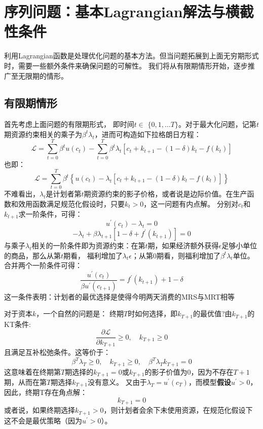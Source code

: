 \section{序列问题：基本Lagrangian解法与横截性条件} \label{sec-sp}

利用Lagrangian函数是处理优化问题的基本方法。但当问题拓展到上面无穷期形式时，需要一些额外条件来确保问题的可解性。
我们将从有限期情形开始，逐步推广至无限期的情形。


\subsection{有限期情形} \label{subsec-finite-h}

首先考虑上面问题的有限期形式，
即时间$t \in$ $\{0,1, \ldots T\}$。对于最大化问题，记第$t$期资源约束相关的乘子为$\beta^t \lambda_t$，进而可构造如下拉格朗日方程：
$$
\mathcal{L}=\sum_{t=0}^T \beta^t u\left(c_t\right)-\sum_{t=0}^T \beta^t \lambda_t\left[c_t+k_{t+1}-(1-\delta) k_t-f\left(k_t\right)\right]
$$
也即：
$$
\mathcal{L}=\sum_{t=0}^T \beta^t\left\{u\left(c_t\right)-\lambda_t\left[c_t+k_{t+1}-(1-\delta) k_t-f\left(k_t\right)\right]\right\}
$$
不难看出，$\lambda_t$是计划者第$t$期资源约束的影子价格，或者说是边际价值。在生产函数和效用函数满足规范化假设时，只要$k_t>0$，这一问题有内点解。
分别对$c_t$和$k_{t+1}$求一阶条件，可得：
$$u^{\prime}\left(c_t\right)-\lambda_t=0$$
$$-\lambda_t+\beta\lambda_{t+1}\left[1-\delta+f^{\prime}\left(k_{t+1}\right)\right]=0$$
与乘子$\lambda_t$相关的一阶条件即为资源约束：在第$t$期，如果经济额外获得$\epsilon$足够小单位的商品，那么从第$t$期看，
福利增加了$\lambda_t\epsilon$；从第0期看，则福利增加了$\beta^t\lambda_t$单位。
合并两个一阶条件可得：
$$
\frac{u^{\prime}\left(c_t\right)}{\beta u^{\prime}\left(c_{t+1}\right)}=f^{\prime}\left(k_{t+1}\right)+1-\delta
$$
这一条件表明：计划者的最优选择是使得今明两天消费的MRS与MRT相等

对于资本$k$，一个自然的问题是：
终期$T$时如何选择，即$k_{T+1}$的最优值?由$k_{T+1}$的KT条件:
$$\frac{\partial \mathcal{L}}{\partial k_{T+1}} \geq 0, \quad k_{T+1} \geq 0$$
且满足互补松弛条件。这等价于：
$$
\beta^T \lambda_T \geq 0, \quad k_{T+1} \geq 0, \quad \beta^T \lambda_T k_{T+1}=0
$$
这意味着在终期第$T$期选择的$k_{T+1}=0$或$k_{T+1}$的影子价值为0，因为不存在$T+1$期，从而在第$T$期选择$k_{T+1}$没有意义。
又由于$\lambda_T=u^{\prime}\left(c_T\right)$，而模型\textbf{假设}$u^{\prime} > 0$，因此，终期T存在角点解：
$$k_{T+1}=0$$
或者说，如果终期选择$k_{T+1}>0$，则计划者会余下未使用资源，在规范化假设下这不会是最优策略（因为$u^{\prime}>0$）。

